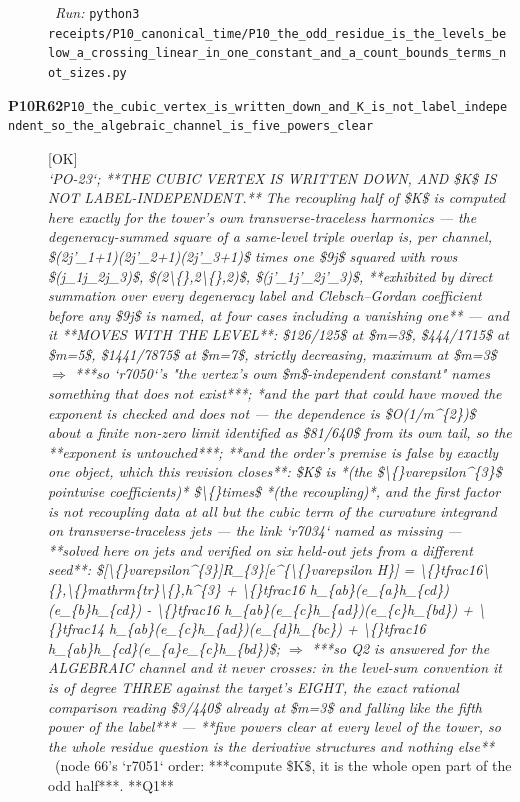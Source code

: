 \begin{description}
\ \emph{Run:} \texttt{python3 receipts/P10\_canonical\_time/P10\_the\_odd\_residue\_is\_the\_levels\_below\_a\_crossing\_linear\_in\_one\_constant\_and\_a\_count\_bounds\_terms\_not\_sizes.py}
\item[\rcptlabel{P10_the_cubic_vertex_is_written_down_and_K_is_not_label_independent_so_the_algebraic_channel_is_five_powers_clear}{P10R62}\textbf{P10R62}\quad\texttt{P10\_the\_cubic\_vertex\_is\_written\_down\_and\_K\_is\_not\_label\_independent\_so\_the\_algebraic\_channel\_is\_five\_powers\_clear}]\hfill\textsf{[OK]}\\
\textit{`PO-23`;  **THE CUBIC VERTEX IS WRITTEN DOWN, AND \$K\$ IS NOT LABEL-INDEPENDENT.** The recoupling half of \$K\$ is computed here exactly for the tower's own transverse-traceless harmonics --- the degeneracy-summed square of a same-level triple overlap is, per channel, \$(2j'\_1+1)(2j'\_2+1)(2j'\_3+1)\$ times one \$9j\$ squared with rows \$(j\_1j\_2j\_3)\$, \$(2\textbackslash\{\},2\textbackslash\{\},2)\$, \$(j'\_1j'\_2j'\_3)\$, **exhibited by direct summation over every degeneracy label and Clebsch--Gordan coefficient before any \$9j\$ is named, at four cases including a vanishing one** --- and it **MOVES WITH THE LEVEL**: \$126/125\$ at \$m=3\$, \$444/1715\$ at \$m=5\$, \$1441/7875\$ at \$m=7\$, strictly decreasing, maximum at \$m=3\$ \ensuremath{\Rightarrow} ***so `r7050`'s "the vertex's own \$m\$-independent constant" names something that does not exist***;  *and the part that could have moved the exponent is checked and does not --- the dependence is \$O(1/m\textasciicircum{}\{2\})\$ about a finite non-zero limit identified as \$81/640\$ from its own tail, so the **exponent is untouched***;  **and the order's premise is false by exactly one object, which this revision closes**: \$K\$ is *(the \$\textbackslash\{\}varepsilon\textasciicircum{}\{3\}\$ pointwise coefficients)* \$\textbackslash\{\}times\$ *(the recoupling)*, and the first factor is not recoupling data at all but the cubic term of the curvature integrand on transverse-traceless jets --- the link `r7034` named as missing --- **solved here on jets and verified on six held-out jets from a different seed**: \$[\textbackslash\{\}varepsilon\textasciicircum{}\{3\}]R\_\{3\}[e\textasciicircum{}\{\textbackslash\{\}varepsilon H\}] = \textbackslash\{\}tfrac16\textbackslash\{\},\textbackslash\{\}mathrm\{tr\}\textbackslash\{\},h\textasciicircum{}\{3\} + \textbackslash\{\}tfrac16 h\_\{ab\}(e\_\{a\}h\_\{cd\})(e\_\{b\}h\_\{cd\}) - \textbackslash\{\}tfrac16 h\_\{ab\}(e\_\{c\}h\_\{ad\})(e\_\{c\}h\_\{bd\}) + \textbackslash\{\}tfrac14 h\_\{ab\}(e\_\{c\}h\_\{ad\})(e\_\{d\}h\_\{bc\}) + \textbackslash\{\}tfrac16 h\_\{ab\}h\_\{cd\}(e\_\{a\}e\_\{c\}h\_\{bd\})\$;  \ensuremath{\Rightarrow} ***so Q2 is answered for the ALGEBRAIC channel and it never crosses: in the level-sum convention it is of degree THREE against the target's EIGHT, the exact rational comparison reading \$3/440\$ already at \$m=3\$ and falling like the fifth power of the label*** --- **five powers clear at every level of the tower, so the whole residue question is the derivative structures and nothing else**} \ (node 66's `r7051` order: ***compute \$K\$, it is the whole open part of the odd half***. **Q1** 
\end{description}
